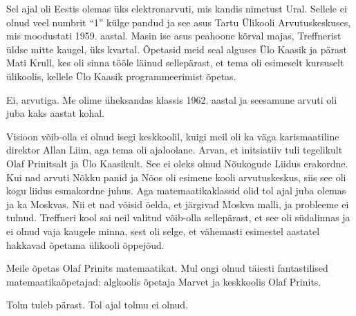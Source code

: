 Sel ajal oli Eestis olemas üks elektronarvuti, mis kandis 
nimetust Ural. Sellele ei olnud veel numbrit \enquote{1} külge 
pandud ja see asus Tartu Ülikooli Arvutuskeskuses, mis moodustati 1959. aastal. Masin ise asus peahoone 
kõrval majas, Treffnerist üldse mitte kaugel, üks kvartal. 
Õpetasid meid seal alguses Ülo Kaasik ja pärast Mati 
Krull, kes oli sinna tööle läinud sellepärast, 
et tema oli esimeselt kursuselt ülikoolis, kellele Ülo Kaasik programmeerimist õpetas. 


Ei, arvutiga. Me olime üheksandas klassis 1962. aastal ja 
seesamune arvuti oli juba kaks aastat kohal. 


Visioon võib-olla ei olnud isegi keskkoolil, kuigi meil 
oli ka väga karismaatiline direktor Allan Liim, aga tema oli ajaloolane. Arvan, et initsiatiiv tuli tegelikult 
Olaf Prinitsalt ja Ülo Kaasikult. See ei oleks olnud Nõukogude Liidus erakordne. Kui nad arvuti 
Nõkku panid ja Nõos oli esimene kooli arvutuskeskus, siis 
see oli kogu liidus esmakordne juhus. Aga matemaatikaklassid olid tol ajal juba 
olemas ja ka Moskvas. Nii et nad võisid öelda, et järgivad 
Moskva malli, ja probleeme ei tulnud. Treffneri kool sai neil valitud võib-olla sellepärast, et see oli südalinnas ja 
ei olnud vaja kaugele minna, sest oli selge, et vähemasti esimestel 
aastatel hakkavad õpetama ülikooli õppejõud. 

Meile õpetas Olaf Prinits 
matemaatikat. Mul ongi olnud täiesti fantastilised 
matemaatikaõpetajad: algkoolis õpetaja Marvet ja keskkoolis Olaf 
Prinits. 


Tolm tuleb pärast. Tol ajal tolmu ei olnud. 

